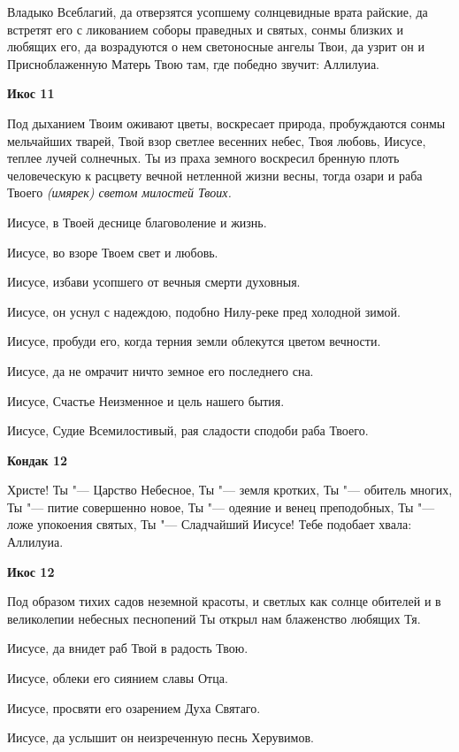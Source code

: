 Владыко Всеблагий, да отверзятся усопшему солнцевидные врата райские, да встретят его с ликованием соборы праведных и святых, сонмы близких и любящих его, да возрадуются о нем светоносные ангелы Твои, да узрит он и Присноблаженную Матерь Твою там, где победно звучит: Аллилуиа.




\bfseries Икос 11\normalfont{}


Под дыханием Твоим оживают цветы, воскресает природа, пробуждаются сонмы мельчайших тварей, Твой взор светлее весенних небес, Твоя любовь, Иисусе, теплее лучей солнечных. Ты из праха земного воскресил бренную плоть человеческую к расцвету вечной нетленной жизни весны, тогда озари и раба Твоего \itshape (имярек)\normalfont{} светом милостей Твоих. 


Иисусе, в Твоей деснице благоволение и жизнь. 


Иисусе, во взоре Твоем свет и любовь. 


Иисусе, избави усопшего от вечныя смерти духовныя. 


Иисусе, он уснул с надеждою, подобно Нилу-реке пред холодной зимой. 


Иисусе, пробуди его, когда терния земли облекутся цветом вечности. 


Иисусе, да не омрачит ничто земное его последнего сна. 


Иисусе, Счастье Неизменное и цель нашего бытия. 


Иисусе, Судие Всемилостивый, рая сладости сподоби раба Твоего.




\bfseries Кондак 12\normalfont{}


Христе! Ты "--- Царство Небесное, Ты "--- земля кротких, Ты "--- обитель многих, Ты "--- питие совершенно новое, Ты "--- одеяние и венец преподобных, Ты "--- ложе упокоения святых, Ты "--- Сладчайший Иисусе! Тебе подобает хвала: Аллилуиа.




\bfseries Икос 12\normalfont{}


Под образом тихих садов неземной красоты, и светлых как солнце обителей и в великолепии небесных песнопений Ты открыл нам блаженство любящих Тя. 


Иисусе, да внидет раб Твой в радость Твою. 


Иисусе, облеки его сиянием славы Отца. 


Иисусе, просвяти его озарением Духа Святаго. 


Иисусе, да услышит он неизреченную песнь Херувимов. 


